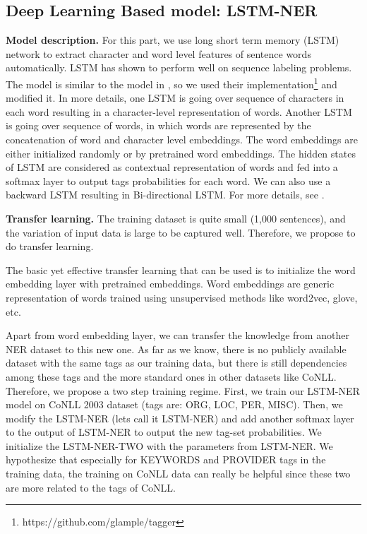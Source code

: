 \documentclass[11pt]{article}
\begin{document}
\subsection{Deep Learning Based model: LSTM-NER}
\textbf{Model description.}
For this part, we use
long short term memory (LSTM) network
to extract character and word level features of sentence words
automatically. 
LSTM has shown to perform well on sequence labeling problems. 
The model is similar to the model in \cite{tagger16}, 
so we used their implementation\footnote{https://github.com/glample/tagger} and modified it.
In more details, 
one LSTM is going over sequence of characters in each word resulting in a 
character-level representation of words. 
Another LSTM is going over sequence of words, in which words are represented 
by the concatenation of word and character level embeddings. 
The word embeddings are either initialized randomly or by pretrained word embeddings. 
The hidden states of LSTM are considered as contextual representation of
words and fed into a softmax layer to output tags probabilities for each word. 
We can also use a backward LSTM resulting in Bi-directional LSTM.
For more details, see .

\textbf{Transfer learning.}
The training dataset is quite small (1,000 sentences), 
and the variation of input data is large to be captured well.
Therefore, we propose to do transfer learning. 

The basic yet effective transfer learning that can be used is to 
initialize the word embedding layer with pretrained 
embeddings. 
Word embeddings are generic representation of words trained using unsupervised methods 
like word2vec, glove, etc. 

Apart from word embedding layer, we can transfer the knowledge from 
another NER dataset to this new one. 
As far as we know, there is no publicly available dataset with the same tags 
as our training data, but there is still dependencies among these tags
and the more standard ones in other datasets like CoNLL. 
Therefore, we propose a two step training regime. 
First, we train our LSTM-NER model on CoNLL 2003 dataset (tags are: ORG, LOC, PER, MISC).
Then, we modify the LSTM-NER (lets call it LSTM-NER)
and add another softmax layer to the output of LSTM-NER
to output the new tag-set probabilities. 
We initialize the LSTM-NER-TWO with the parameters 
from LSTM-NER.
We hypothesize that especially for KEYWORDS and PROVIDER tags in the training data,
the training on CoNLL data can really be helpful since 
these two are more related to the tags of CoNLL.
\end{document}
